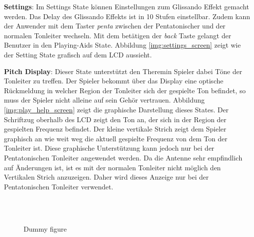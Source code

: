 \textbf{Settings}:
Im Settings State können Einstellungen zum Glissando Effekt gemacht werden. Das Delay des Glissando Effekts ist in 10 Stufen einstellbar. Zudem kann der Anwender mit dem Taster \textit{penta} zwischen der Pentatonischer und der normalen Tonleiter wechseln. Mit dem betätigen der \textit{back} Taste gelangt der Benutzer in den Playing-Aids State. Abbildung \ref{img:settings_screen} zeigt wie der Setting State grafisch auf dem LCD aussieht.

\textbf{Pitch Display}:
Dieser State unterstützt den Theremin Spieler dabei Töne der Tonleiter zu treffen. Der Spieler bekommt über das Display eine optische Rückmeldung in welcher Region der Tonleiter sich der gespielte Ton befindet, so muss der Spieler nicht alleine auf sein Gehör vertrauen.
Abbildung \ref{img:play_help_screen} zeigt die graphische Darstellung dieses States.  
Der Schriftzug oberhalb des LCD zeigt den Ton an, der sich in der Region der gespielten Frequenz befindet. 
Der kleine vertikale Strich zeigt dem Spieler graphisch an wie weit weg die aktuell gespielte Frequenz von dem Ton der Tonleiter ist. 
Diese graphische Unterstützung kann jedoch nur bei der Pentatonischen Tonleiter angewendet werden.  Da die Antenne sehr empfindlich auf Änderungen ist, ist es mit der normalen Tonleiter nicht möglich den Vertikalen Strich anzuzeigen. Daher wird dieses Anzeige nur bei der Pentatonischen Tonleiter verwendet.

\begin{figure}[!ht]
	\hfill
	\hfill
	\\
	\hfill
	\hfill
	\\
	\hfill

	\caption{Dummy figure}
	\label{fig:dummy}
\end{figure}
